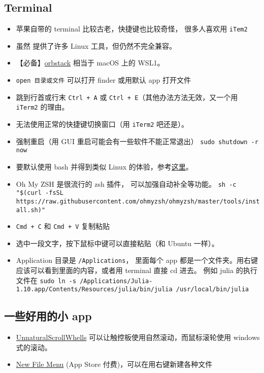 \subsection{Terminal}
\begin{itemize}
\item 苹果自带的 terminal 比较古老，快捷键也比较奇怪， 很多人喜欢用 \verb`iTem2`
\item 虽然  提供了许多 Linux 工具，但仍然不完全兼容。
\item 【必备】\href{https://orbstack.dev/}{orbstack} 相当于 macOS 上的 WSL1。
\item \verb`open 目录或文件` 可以打开 finder 或用默认 app 打开文件
\item 跳到行首或行末 \verb`Ctrl + A` 或 \verb`Ctrl + E`（其他办法方法无效，又一个用 \verb`iTerm2` 的理由。
\item 无法使用正常的快捷键切换窗口（用 \verb`iTerm2` 吧还是）。
\item 强制重启（用 GUI 重启可能会有一些软件不能正常退出） \verb|sudo shutdown -r now|
\item 要默认使用 bash 并得到类似 Linux 的体验，参考\href{https://medium.com/@geraldcroes/the-good-tweak-the-bad-mac-and-the-ugly-terminal-8f18b3c3d687}{这里}。
\item Oh My ZSH 是很流行的 zsh 插件， 可以加强自动补全等功能。 \verb`sh -c "$(curl -fsSL https://raw.githubusercontent.com/ohmyzsh/ohmyzsh/master/tools/install.sh)"`
\item \verb`Cmd + C` 和 \verb`Cmd + V` 复制粘贴
\item 选中一段文字，按下鼠标中键可以直接粘贴（和 Ubuntu 一样）。
\item Application 目录是 \verb`/Applications`， 里面每个 app 都是一个文件夹。用右键应该可以看到里面的内容，或者用 terminal 直接 cd 进去。 例如 julia 的执行文件在 \verb`sudo ln -s /Applications/Julia-1.10.app/Contents/Resources/julia/bin/julia /usr/local/bin/julia`
\end{itemize}

\subsection{一些好用的小 app}
\begin{itemize}
\item \href{https://github.com/ther0n/UnnaturalScrollWheels}{UnnaturalScrollWhells} 可以让触控板使用自然滚动，而鼠标滚轮使用 windows 式的滚动。
\item \href{https://apps.apple.com/us/app/new-file-menu/id1064959555?mt=12}{New File Menu} (App Store 付费)，可以在用右键新建各种文件
\end{itemize}

